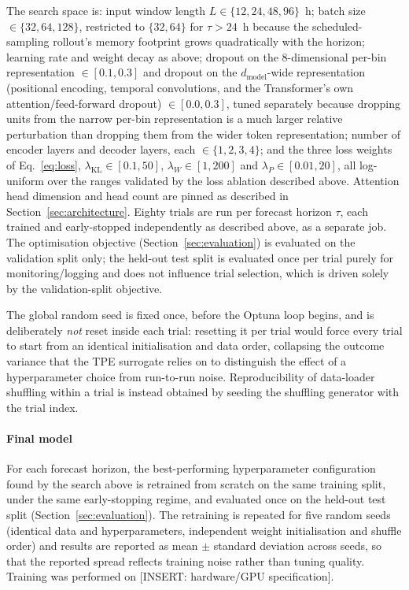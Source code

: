 The search space is: input window length $L \in \{12, 24, 48, 96\}$~h; batch size $\in \{32, 64, 128\}$, restricted to $\{32, 64\}$ for $\tau > 24$~h because the scheduled-sampling rollout's memory footprint grows quadratically with the horizon; learning rate and weight decay as above; dropout on the 8-dimensional per-bin representation $\in [0.1, 0.3]$ and dropout on the $d_{\text{model}}$-wide representation (positional encoding, temporal convolutions, and the Transformer's own attention/feed-forward dropout) $\in [0.0, 0.3]$, tuned separately because dropping units from the narrow per-bin representation is a much larger relative perturbation than dropping them from the wider token representation; number of encoder layers and decoder layers, each $\in \{1,2,3,4\}$; and the three loss weights of Eq.~\eqref{eq:loss}, $\lambda_{\text{KL}} \in [0.1, 50]$, $\lambda_{W} \in [1, 200]$ and $\lambda_{P} \in [0.01, 20]$, all log-uniform over the ranges validated by the loss ablation described above. Attention head dimension and head count are pinned as described in Section~\ref{sec:architecture}. Eighty trials are run per forecast horizon $\tau$, each trained and early-stopped independently as described above, as a separate job. The optimisation objective (Section~\ref{sec:evaluation}) is evaluated on the validation split only; the held-out test split is evaluated once per trial
purely for monitoring/logging and does not influence trial selection, which is driven solely by the validation-split objective.

The global random seed is fixed once, before the Optuna loop begins, and is deliberately \emph{not} reset inside each trial: resetting it per trial would force every trial to start from an identical initialisation and data order, collapsing the outcome variance that the TPE surrogate relies on to distinguish the effect of a hyperparameter choice from run-to-run noise. Reproducibility of data-loader shuffling within a trial is instead obtained by seeding the shuffling generator with the trial index.

\paragraph{Final model}
For each forecast horizon, the best-performing hyperparameter configuration found by the search above is retrained from scratch on the same training split, under the same early-stopping regime, and evaluated once on the held-out test split (Section~\ref{sec:evaluation}). The retraining is repeated for five random seeds (identical data and hyperparameters, independent weight initialisation and shuffle order) and results are reported as mean $\pm$ standard deviation across seeds, so that the reported spread reflects training noise rather than tuning quality. Training was performed on [INSERT: hardware/GPU specification].

